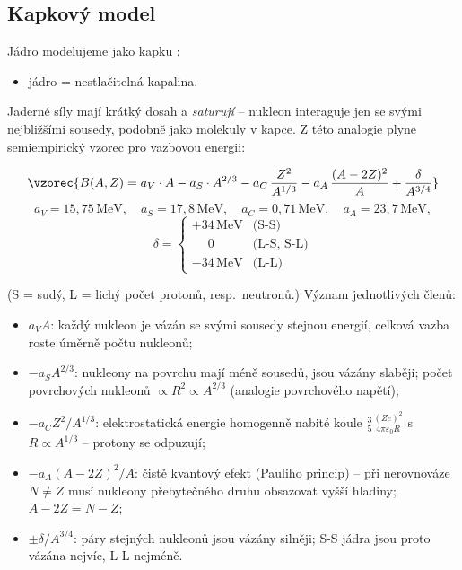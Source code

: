 \subsection{Kapkový model}

Jádro modelujeme jako kapku :
\begin{itemize}
  \item jádro = nestlačitelná kapalina.
\end{itemize}
Jaderné síly mají krátký dosah a \emph{saturují} -- nukleon interaguje jen se
svými nejbližšími sousedy, podobně jako molekuly v kapce. Z této analogie
plyne semiempirický vzorec pro vazbovou energii:

\begin{veta}
\[
  \vzorec{B(A,Z) = a_V\cdot A - a_S\cdot A^{2/3} - a_C\,\frac{Z^2}{A^{1/3}}
  - a_A\,\frac{(A-2Z)^2}{A} + \frac{\delta}{A^{3/4}}}
\]
\[
  a_V = 15{,}75\,\mathrm{MeV},\quad a_S = 17{,}8\,\mathrm{MeV},\quad
  a_C = 0{,}71\,\mathrm{MeV},\quad a_A = 23{,}7\,\mathrm{MeV},
\]
\[
  \delta = \begin{cases}
    +34\,\mathrm{MeV} & \text{(S-S)}\\
    \phantom{+3}0 & \text{(L-S, S-L)}\\
    -34\,\mathrm{MeV} & \text{(L-L)}
  \end{cases}
\]
\end{veta}
(S = sudý, L = lichý počet protonů, resp.\ neutronů.) Význam jednotlivých
členů:
\begin{itemize}
  \item {} \(a_VA\): každý nukleon je vázán se svými sousedy
    stejnou energií, celková vazba roste úměrně počtu nukleonů;
  \item {} \(-a_SA^{2/3}\): nukleony na povrchu mají méně
    sousedů, jsou vázány slaběji; počet povrchových nukleonů \(\propto R^2
    \propto A^{2/3}\) (analogie povrchového napětí);
  \item {} \(-a_CZ^2/A^{1/3}\): elektrostatická energie
    homogenně nabité koule \(\frac35\frac{(Ze)^2}{4\pi\varepsilon_0R}\) s
    \(R\propto A^{1/3}\) -- protony se odpuzují;
  \item {} \(-a_A(A-2Z)^2/A\): čistě kvantový efekt
    (Pauliho princip) -- při nerovnováze \(N\neq Z\) musí nukleony
    přebytečného druhu obsazovat vyšší hladiny; \(A-2Z = N-Z\);
  \item {} \(\pm\delta/A^{3/4}\): páry stejných nukleonů jsou
    vázány silněji; S-S jádra jsou proto vázána nejvíc, L-L nejméně.
\end{itemize}

